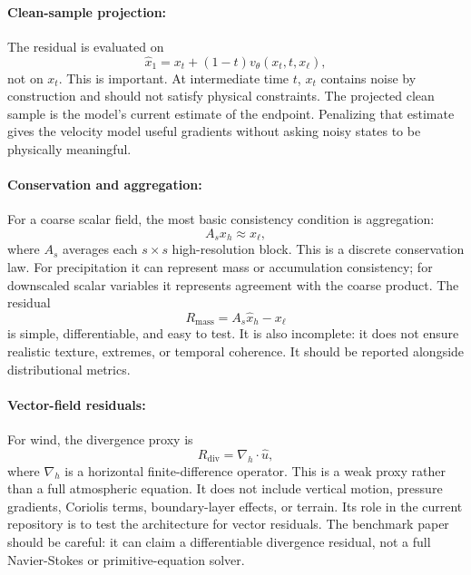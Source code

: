 \documentclass{article}
\begin{document}
\paragraph{Clean-sample projection:}

The residual is evaluated on
\begin{equation}
  \hat{x}_1=x_t+(1-t)v_{\theta}(x_t,t,x_{\ell}),
\end{equation}
not on $x_t$. This is important. At intermediate time $t$, $x_t$ contains noise by construction and should not satisfy physical constraints. The projected clean sample is the model's current estimate of the endpoint. Penalizing that estimate gives the velocity model useful gradients without asking noisy states to be physically meaningful.

\paragraph{Conservation and aggregation:}

For a coarse scalar field, the most basic consistency condition is aggregation:
\begin{equation}
  A_s x_h \approx x_{\ell},
\end{equation}
where $A_s$ averages each $s\times s$ high-resolution block. This is a discrete conservation law. For precipitation it can represent mass or accumulation consistency; for downscaled scalar variables it represents agreement with the coarse product. The residual
\begin{equation}
  R_{\text{mass}}=A_s\hat{x}_h-x_{\ell}
\end{equation}
is simple, differentiable, and easy to test. It is also incomplete: it does not ensure realistic texture, extremes, or temporal coherence. It should be reported alongside distributional metrics.

\paragraph{Vector-field residuals:}

For wind, the divergence proxy is
\begin{equation}
  R_{\text{div}}=\nabla_h\cdot \hat{u},
\end{equation}
where $\nabla_h$ is a horizontal finite-difference operator. This is a weak proxy rather than a full atmospheric equation. It does not include vertical motion, pressure gradients, Coriolis terms, boundary-layer effects, or terrain. Its role in the current repository is to test the architecture for vector residuals. The benchmark paper should be careful: it can claim a differentiable divergence residual, not a full Navier-Stokes or primitive-equation solver.
\end{document}

